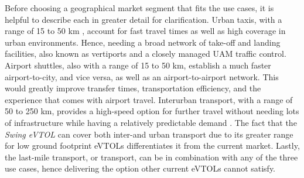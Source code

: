 Before choosing a geographical market segment that fits the use cases, it is helpful to describe each in greater detail for clarification.
Urban taxis, with a range of 15 to 50 km \cite{potential90uam}, account for fast travel times as well as high coverage in urban environments.
Hence, needing a broad network of take-off and landing facilities, also known as vertiports and a closely managed UAM traffic control.
Airport shuttles, also with a range of 15 to 50 km, establish a much faster airport-to-city, and vice versa, as well as an airport-to-airport network.
This would greatly improve transfer times, transportation efficiency, and the experience that comes with airport travel.
Interurban transport, with a range of 50 to 250 km, provides a high-speed option for further travel without needing lots of infrastructure while having a relatively predictable demand \cite{UAMroland}.
The fact that the \textit{Swing eVTOL} can cover both inter-and urban transport due to its greater range for low ground footprint eVTOLs differentiates it from the current market.
Lastly, the last-mile transport, or transport, can be in combination with any of the three use cases, hence delivering the option other current eVTOLs cannot satisfy.

